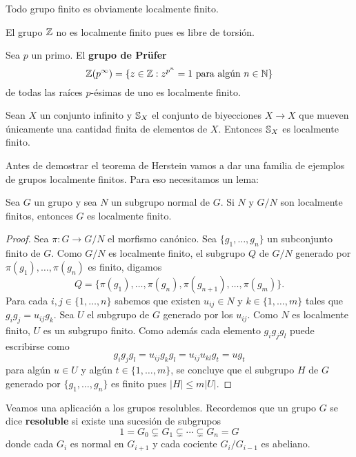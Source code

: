 \begin{example}
	Todo grupo finito es obviamente localmente finito.
\end{example}

\begin{example}
	El grupo $\mathbb{Z}$ no es localmente finito pues es libre de torsión.
\end{example}

\begin{example}
	Sea $p$ un primo.  El \textbf{grupo de Pr\"ufer}
	\[
		\mathbb{Z}(p^{\infty})=\{z\in\mathbb{Z}:z^{p^n}=1\text{ para algún $n\in\mathbb{N}$}\}
	\]
	de todas
	las raíces $p$-ésimas de uno es localmente finito.
\end{example}

\begin{example}
	Sean $X$ un conjunto infinito y $\mathbb{S}_X$ el conjunto de biyecciones $X\to
	X$ que mueven únicamente una cantidad finita de elementos de $X$. Entonces
	$\mathbb{S}_X$ es localmente finito.
\end{example}

Antes de demostrar el teorema de Herstein vamos a dar una familia de ejemplos
de grupos localmente finitos. Para eso necesitamos un lema:

\begin{lemma}
	\label{lem:solvable_torsion=>lf}
	Sea $G$ un grupo y sea $N$ un subgrupo normal de $G$. Si $N$ y $G/N$ son
	localmente finitos, entonces $G$ es localmente finito.
\end{lemma}

\begin{proof}
	Sea $\pi\colon G\to G/N$ el morfismo canónico. Sea $\{g_1,\dots,g_n\}$ un
	subconjunto finito de $G$. Como $G/N$ es localmente finito, el subgrupo $Q$
	de $G/N$ generado por $\pi(g_1),\dots,\pi(g_n)$ es finito, digamos
	\[
		Q=\{\pi(g_1),\dots,\pi(g_n),\pi(g_{n+1}),\dots,\pi(g_m)\}.
	\]
	Para cada $i,j\in\{1,\dots,n\}$ sabemos que existen $u_{ij}\in N$ y
	$k\in\{1,\dots,m\}$ tales que $g_ig_j=u_{ij}g_k$. Sea $U$ el subgrupo de
	$G$ generado por los $u_{ij}$. Como $N$ es localmente finito, $U$ es un
	subgrupo finito. Como además cada elemento $g_ig_jg_l$ puede escribirse como
	\[
		g_ig_jg_l=u_{ij}g_kg_l=u_{ij}u_{kl}g_t=ug_t
	\]
	para algún $u\in U$ y algún $t\in\{1,\dots,m\}$, se concluye que el
	subgrupo $H$ de $G$ generado por $\{g_1,\dots,g_n\}$ es finito pues
	$|H|\leq m|U|$. 
\end{proof}

Veamos una aplicación a los grupos resolubles. Recordemos que un grupo $G$ se
dice \textbf{resoluble} si existe una sucesión de subgrupos 
\begin{equation}
	\label{eq:resoluble}
	1=G_0\subsetneq G_1\subsetneq \cdots\subsetneq G_n=G
\end{equation}
donde cada $G_i$ es normal en $G_{i+1}$ y cada cociente $G_i/G_{i-1}$ es
abeliano.

